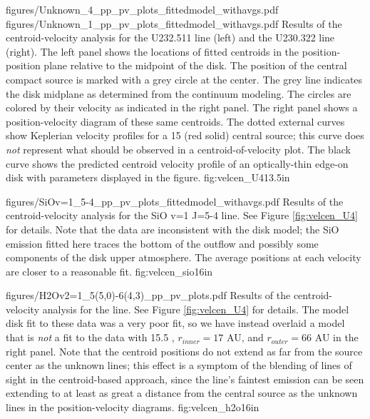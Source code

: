 \documentclass[twocolumn]{aastex61}
\begin{document}
\FigureTwo
{figures/Unknown_4_pp_pv_plots_fittedmodel_withavgs.pdf}
{figures/Unknown_1_pp_pv_plots_fittedmodel_withavgs.pdf}
{Results of the centroid-velocity analysis for the U232.511 line (left) and the U230.322 line (right).
The left panel shows the locations of fitted centroids in the position-position
plane relative to the midpoint of the disk.  
The position of the central compact source is
marked with a grey circle at the center.  The grey line indicates the disk
midplane as determined from the continuum modeling.  The circles are colored by
their velocity as indicated in
the right panel.  The right panel shows a position-velocity diagram of these
same centroids.  The dotted external curves show Keplerian velocity profiles
for a  15 \msun (red solid) central source; this curve does \emph{not} represent
what should be observed in a centroid-of-velocity plot.
The black curve shows the predicted centroid velocity profile of an
optically-thin edge-on disk with parameters displayed in the figure.
}
{fig:velcen_U4}{1}{3.5in}

\Figure
{figures/SiOv=1_5-4_pp_pv_plots_fittedmodel_withavgs.pdf}
{Results of the centroid-velocity analysis for the SiO v=1 J=5-4 line.
See Figure \ref{fig:velcen_U4} for details.
Note that the data are inconsistent with the disk model;
the SiO emission fitted here traces the bottom of the outflow
and possibly some components of the disk upper atmosphere.
The average positions at each velocity are closer to a reasonable fit.
}
{fig:velcen_sio}{1}{6in}

\Figure
{figures/H2Ov2=1_5(5,0)-6(4,3)_pp_pv_plots.pdf}
{Results of the centroid-velocity analysis for the \water line.
See Figure \ref{fig:velcen_U4} for details.
The model disk fit to these data was a very poor fit, so we
have instead overlaid a model that is \emph{not} a fit to the data
with 15.5 \msun, $r_{inner}=17$ AU, and $r_{outer}=66$ AU in the
right panel.
Note that the centroid positions do not extend as far from
the source center as the unknown lines; this effect is 
a symptom of the blending of lines of sight in the centroid-based approach,
since the \water line's faintest emission can be seen extending to at least as
great a distance from the central source as the unknown lines in the
position-velocity diagrams.
}
{fig:velcen_h2o}{1}{6in}
\end{document}
